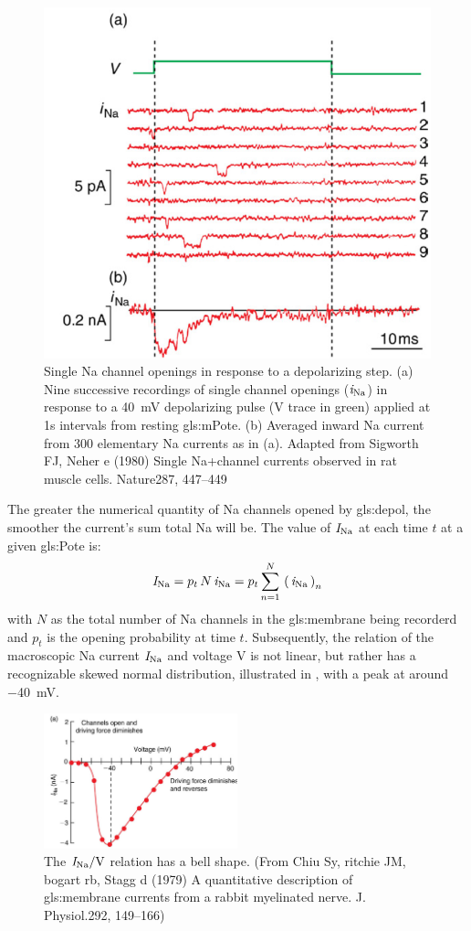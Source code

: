 \documentclass[class={myRUCProject}, crop=false]{standalone}
\begin{document}
\begin{figure}[H]
  \centering
  \includegraphics[width=0.5\linewidth]{Pictures//Anakin/iNa.png}
  \caption{Single \gls{Na} channel openings in response to a depolarizing step. (a) Nine successive recordings of single channel openings (\(\mathit{i}_\mathrm{Na}\)) in response to a \qty{ 40}{\mV} depolarizing pulse (V trace in green) applied at 1s intervals from resting \gls{gls:mPote}. (b) Averaged inward \gls{Na} current from 300 elementary \gls{Na} currents as in (a). Adapted from Sigworth FJ, Neher e (1980) Single Na+channel currents observed in rat muscle cells. Nature287, 447–449 }
  \label{fig:unitcurNa}
\end{figure}

The greater the numerical quantity of \gls{Na} channels opened by \gls{gls:depol}, the smoother the current's sum total \gls{Na} will be. 
The value of \(\mathit{I}_\mathrm{Na}\) at each time \(t\) at a given \gls{gls:Pote} is: 
\begin{equation}\label{eq:nasum}
  \mathit{I}_\mathrm{Na} = p_t \, N \, \mathit{i}_\mathrm{Na} = p_t \sum^N_{n=1} \, \left(\,\mathit{i}_\mathrm{Na}\,\right)_n 
\end{equation}
with \(N\) as the total number of \gls{Na} channels in the \gls{gls:membrane} being recorderd and \(p_t\) is the opening probability at time \(t\). 
Subsequently, the relation of the macroscopic \gls{Na} current \(\mathit{I}_\mathrm{Na}\) and voltage \(\unit{\V}\) is not linear, but rather has a recognizable skewed normal distribution, illustrated in , with a peak at around \qty{-40}{\mV}. 
\begin{figure}[H]
  \centering
  \includegraphics[width=0.5\textwidth]{Pictures//Anakin/I-V.bell.png}
  \caption{The \(\curr\sodium/\unit{\V}\) relation has a bell shape. (From Chiu Sy, ritchie JM, bogart rb, Stagg d (1979) A quantitative description of \gls{gls:membrane} currents from a rabbit myelinated nerve. J. Physiol.292, 149–166)}\label{fig:IVdist}
\end{figure}
 
\end{document}
